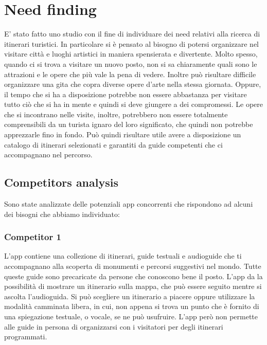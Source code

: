 

\section*{Need finding}

E' stato fatto uno studio con il fine di individuare dei need relativi alla ricerca
di itinerari turistici. In particolare si è pensato al bisogno di potersi organizzare nel visitare città e
luoghi artistici in maniera spensierata e divertente. Molto spesso, quando ci si trova a 
visitare un nuovo posto, non si sa chiaramente quali sono le attrazioni e le opere che più
vale la pena di vedere. Inoltre può risultare difficile organizzare una gita che copra
diverse opere d'arte nella stessa giornata. Oppure, il tempo che si ha a disposizione potrebbe non
essere abbastanza per visitare tutto ciò che si ha in mente e quindi si deve giungere a dei compromessi.
Le opere che si incontrano nelle visite, inoltre, potrebbero non essere totalmente comprensibili
da un turista ignaro del loro significato, che quindi non potrebbe apprezzarle fino in fondo.
Può quindi risultare utile avere a disposizione un catalogo di itinerari selezionati e
garantiti da guide competenti che ci accompagnano nel percorso.

\subsection*{Competitors analysis}

Sono state analizzate delle potenziali app concorrenti che rispondono ad alcuni dei bisogni
che abbiamo individuato:

\subsubsection*{Competitor 1}
L'app contiene una collezione di itinerari, guide testuali e audioguide che ti accompagnano
alla scoperta di monumenti e percorsi suggestivi nel mondo.
Tutte queste guide sono precaricate da persone che conoscono bene il posto.
L’app da la possibilità di mostrare un itinerario sulla mappa, che può essere seguito
mentre si ascolta l’audioguida.
Si può scegliere un itinerario a piacere oppure utilizzare la modalità camminata libera,
in cui, non appena si trova un punto che è fornito di una spiegazione testuale, o vocale,
se ne può usufruire.
L’app però non permette alle guide in persona di organizzarsi con i visitatori per degli
itinerari programmati.
